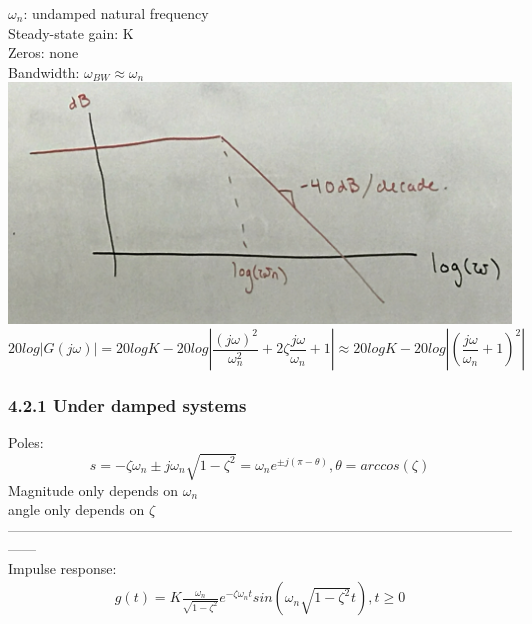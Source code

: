 \documentclass[letterpaper]{article}
\begin{document}
$\omega_n$: undamped natural frequency\\
Steady-state gain: K\\
Zeros: none\\
Bandwidth: $\omega_{BW}\approx \omega_n$\\
\includegraphics[scale=0.1]{images/4_2BANDWIDTH.jpg}
$$20log|G(j\omega)|=20logK-20log|\frac{(j\omega)^2}{\omega_n^2}+2\zeta\frac{j\omega}{\omega_n}+1|\approx 20logK-20log|(\frac{j\omega}{\omega_n}+1)^2|$$
\subsubsection*{4.2.1 Under damped systems}
Poles: $$s=-\zeta\omega_n\pm j\omega_n\sqrt{1-\zeta^2}=\omega_ne^{\pm j(\pi-\theta)}, \theta=arccos(\zeta)$$
Magnitude only depends on $\omega_n$\\
angle only depends on $\zeta$\\
------------------------------------------------------------------------------------------------------------------\\
Impulse response:
\begin{align*}
g(t)=K\frac{\omega_n}{\sqrt{1-\zeta^2}}e^{-\zeta\omega_n t}sin(\omega_n\sqrt{1-\zeta^2}t),t\geq 0
\end{align*}
		
		
		
		
		
		
		
		
		
		
		

		
		
		
		
		
		
		
		
		
		
		
		
		
		
		
		
		
		
		
		
		
		
		
		
		
		
		
		
		
		
		
		
		
		
		
		
		
		
		
\end{document}
